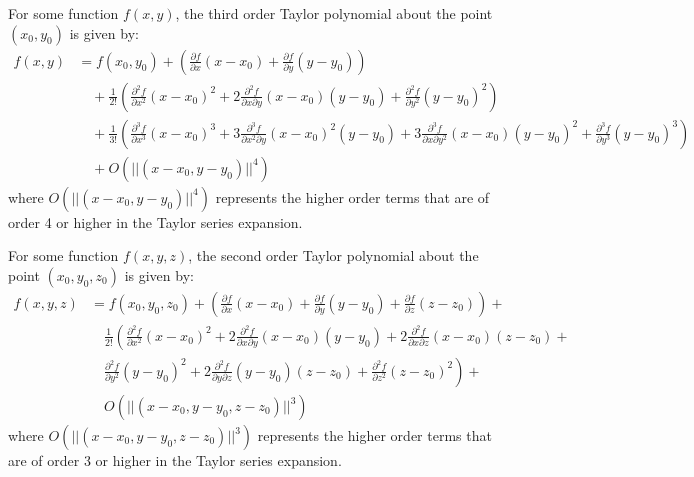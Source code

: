 \documentclass[11pt]{report}
\begin{document}
\begin{example}
    For some function $f(x,y)$, the third order Taylor polynomial about the point $(x_0,y_0)$ is given by:
    \begin{align*}
        f(x,y) &= f(x_0,y_0) + \left( \frac{\partial f}{\partial x} (x - x_0) + \frac{\partial f}{\partial y} (y - y_0) \right) \\
        &\quad + \frac{1}{2!} \left( \frac{\partial^2 f}{\partial x^2} (x - x_0)^2 + 2\frac{\partial^2 f}{\partial x \partial y} (x - x_0)(y - y_0) + \frac{\partial^2 f}{\partial y^2} (y - y_0)^2 \right) \\
        &\quad + \frac{1}{3!} \left( \frac{\partial^3 f}{\partial x^3} (x - x_0)^3 + 3\frac{\partial^3 f}{\partial x^2 \partial y} (x - x_0)^2 (y - y_0) + 3\frac{\partial^3 f}{\partial x \partial y^2} (x - x_0)(y - y_0)^2 + \frac{\partial^3 f}{\partial y^3} (y - y_0)^3 \right) \\
        &\quad + O\left( ||(x - x_0, y - y_0)||^4 \right)
    \end{align*}
    where $O\left( ||(x - x_0, y - y_0)||^4 \right)$ represents the higher order terms that are of order 4 or higher in the Taylor series expansion.
\end{example}

\begin{example}
    For some function $f(x,y,z)$, the second order Taylor polynomial about the point $(x_0,y_0,z_0)$ is given by:
    \begin{align*}
        f(x,y,z) &= f(x_0,y_0,z_0) + \left( \frac{\partial f}{\partial x} (x - x_0) + \frac{\partial f}{\partial y} (y - y_0) + \frac{\partial f}{\partial z} (z - z_0) \right) + \\
        &\quad \frac{1}{2!} \left( \frac{\partial^2 f}{\partial x^2} (x - x_0)^2 + 2\frac{\partial^2 f}{\partial x \partial y} (x - x_0)(y - y_0) + 2\frac{\partial^2 f}{\partial x \partial z} (x - x_0)(z - z_0) + \right. \\
        &\quad \left. \frac{\partial^2 f}{\partial y^2} (y - y_0)^2 + 2\frac{\partial^2 f}{\partial y \partial z} (y - y_0)(z - z_0) + \frac{\partial^2 f}{\partial z^2} (z - z_0)^2 \right) + \\
        &\quad O\left( ||(x - x_0, y - y_0, z - z_0)||^3 \right)
    \end{align*}
    where $O\left( ||(x - x_0, y - y_0, z - z_0)||^3 \right)$ represents the higher order terms that are of order 3 or higher in the Taylor series expansion.
    
\end{example}
\end{document}
